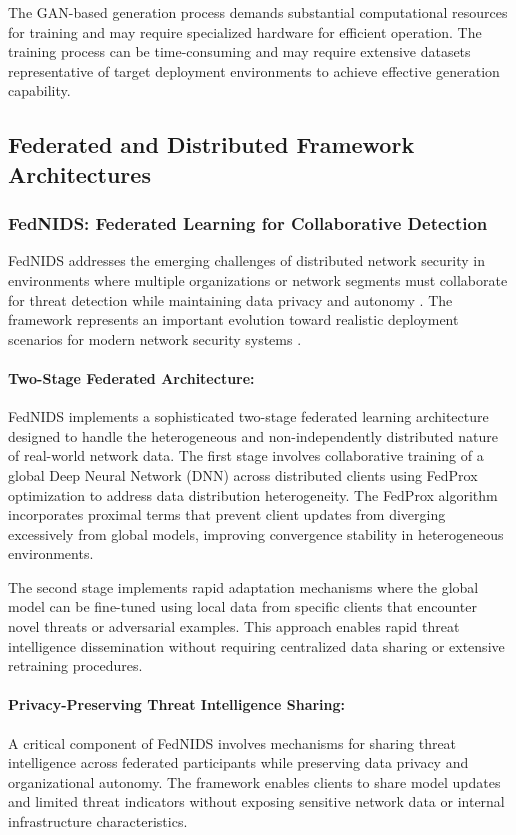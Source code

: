 The GAN-based generation process demands substantial computational resources for training and may require specialized hardware for efficient operation. The training process can be time-consuming and may require extensive datasets representative of target deployment environments to achieve effective generation capability.

\subsection{Federated and Distributed Framework Architectures}

\subsubsection{FedNIDS: Federated Learning for Collaborative Detection}

FedNIDS addresses the emerging challenges of distributed network security in environments where multiple organizations or network segments must collaborate for threat detection while maintaining data privacy and autonomy \cite{vitorino2023sok}. The framework represents an important evolution toward realistic deployment scenarios for modern network security systems \cite{vitorino2023sok}.

\paragraph{Two-Stage Federated Architecture:}
FedNIDS implements a sophisticated two-stage federated learning architecture designed to handle the heterogeneous and non-independently distributed nature of real-world network data. The first stage involves collaborative training of a global Deep Neural Network (DNN) across distributed clients using FedProx optimization to address data distribution heterogeneity. The FedProx algorithm incorporates proximal terms that prevent client updates from diverging excessively from global models, improving convergence stability in heterogeneous environments.

The second stage implements rapid adaptation mechanisms where the global model can be fine-tuned using local data from specific clients that encounter novel threats or adversarial examples. This approach enables rapid threat intelligence dissemination without requiring centralized data sharing or extensive retraining procedures.

\paragraph{Privacy-Preserving Threat Intelligence Sharing:}
A critical component of FedNIDS involves mechanisms for sharing threat intelligence across federated participants while preserving data privacy and organizational autonomy. The framework enables clients to share model updates and limited threat indicators without exposing sensitive network data or internal infrastructure characteristics.

